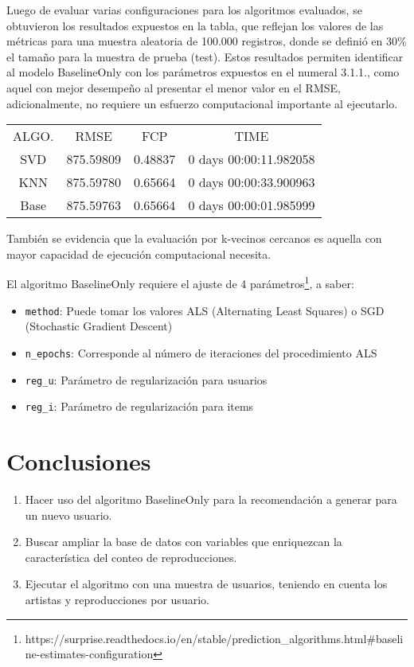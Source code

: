 \documentclass{article}
\begin{document}

Luego de evaluar varias configuraciones para los algoritmos evaluados, se obtuvieron los resultados expuestos en la tabla, que reflejan los valores de las métricas para una muestra aleatoria de 100.000 registros, donde se definió en 30\% el tamaño para la muestra de prueba (test).  Estos resultados permiten identificar al modelo BaselineOnly con los parámetros expuestos en el numeral 3.1.1., como aquel con mejor desempeño al presentar el menor valor en el RMSE, adicionalmente, no requiere un esfuerzo computacional importante al ejecutarlo.

\begin{center}
\begin{tabular}{ c c c c }
	ALGO. & RMSE & FCP & TIME\\
	SVD & 875.59809 & 0.48837 & 0 days 00:00:11.982058\\
	KNN & 875.59780 & 0.65664 & 0 days 00:00:33.900963\\
	Base & 875.59763 & 0.65664 & 0 days 00:00:01.985999	
\end{tabular}
\end{center}

También se evidencia que la evaluación por k-vecinos cercanos es aquella con mayor capacidad de ejecución computacional necesita. 

El algoritmo BaselineOnly requiere el ajuste de 4 parámetros\footnote{https://surprise.readthedocs.io/en/stable/prediction_algorithms.html#baseline-estimates-configuration}, a saber:

\begin{itemize}
    \item \verb|method|: Puede tomar los valores ALS (Alternating Least Squares) o SGD (Stochastic Gradient Descent)
    \item \verb|n_epochs|: Corresponde al número de iteraciones del procedimiento ALS
    \item \verb|reg_u|: Parámetro de regularización para usuarios 
    \item \verb|reg_i|: Parámetro de regularización para items
\end{itemize}

\section{Conclusiones}
\begin{enumerate}
    \item Hacer uso del algoritmo BaselineOnly para la recomendación a generar para un nuevo usuario.
    \item Buscar ampliar la base de datos con variables que enriquezcan la característica del conteo de reproducciones.
    \item Ejecutar el algoritmo con una muestra de usuarios, teniendo en cuenta los artistas y reproducciones por usuario.
\end{enumerate}
\end{document}
